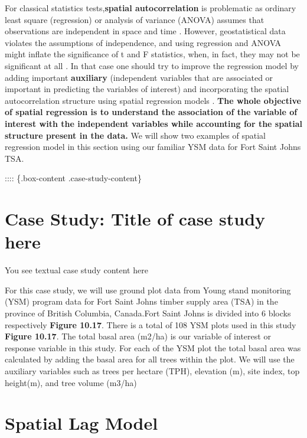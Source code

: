 \documentclass[
]{book}
\begin{document}
For classical statistics tests,\textbf{spatial autocorrelation} is problematic as ordinary least square (regression) or analysis of variance (ANOVA) assumes that observations are independent in space and time \citep{Meng2009}. However, geostatistical data violates the assumptions of independence, and using regression and ANOVA might inflate the significance of t and F statistics, when, in fact, they may not be significant at all \citep{Meng2009}. In that case one should try to improve the regression model by adding important \textbf{auxiliary} (independent variables that are associated or important in predicting the variables of interest) and incorporating the spatial autocorrelation structure \citep{Meng2009} using spatial regression models \citep{Anselin1998}. \textbf{The whole objective of spatial regression is to understand the association of the variable of interest with the independent variables while accounting for the spatial structure present in the data.} We will show two examples of spatial regression model in this section using our familiar YSM data for Fort Saint Johns TSA.

:::: \{.box-content .case-study-content\}

\hypertarget{case-study-title-of-case-study-here-6}{%
\section{Case Study: Title of case study here}\label{case-study-title-of-case-study-here-6}}

You see textual case study content here

For this case study, we will use ground plot data from Young stand monitoring (YSM) program data \citep{ProvinceofBC2018} for Fort Saint Johns timber supply area (TSA) in the province of British Columbia, Canada.Fort Saint Johns is divided into 6 blocks respectively \textbf{Figure 10.17}. There is a total of 108 YSM plots used in this study \textbf{Figure 10.17}. The total basal area (m2/ha) is our variable of interest or response variable in this study. For each of the YSM plot the total basal area was calculated by adding the basal area for all trees within the plot. We will use the auxiliary variables such as trees per hectare (TPH), elevation (m), site index, top height(m), and tree volume (m3/ha)

\hypertarget{spatial-lag-model}{%
\section{Spatial Lag Model}\label{spatial-lag-model}}
\end{document}

